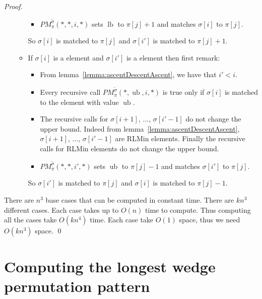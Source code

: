 \documentclass[a4paper]{llncs}
\newcommand{\RLMax}{\text{RLMax}}
\newcommand{\ptext}{\pi}
\newcommand{\ppattern}{\sigma}
\newcommand{\PM}{PM}
\DeclareMathOperator{\lb}{lb}
\DeclareMathOperator{\ub}{ub}
\begin{document}
\begin{proof}
\begin{itemize}
\begin{itemize}
\begin{itemize}
				\item $\PM^{\widetilde{\sigma}}_{\ptext}(*,*,i,*)$ sets $\lb$ to $\ptext[j]+1$ and matches $\sigma[i]$ to $\ptext[j]$.
				
			\end{itemize}
			So $\sigma[i]$ is matched to $\ptext[j]$ and
			$\sigma[i']$ is matched to $\ptext[j]+1$.


			\item If $\ppattern[i]$ is a \RLMax element and $\ppattern[i']$ is a \RLMax element then
			first remark:
			\begin{itemize}
				\item From lemma~\ref{lemma:ascentDescentAscent}, 
				we have that $i'<i$.				
				
				\item  Every recursive call $\PM^{\widetilde{\sigma}}_{\ptext}(*,\ub,i,*)$ is true only if $\sigma[i]$ is matched to the element with value $\ub$. 
				
				\item  The recursive calls for $\sigma[i+1]$, $\ldots$, $\sigma[i'-1]$ do not change the upper bound. Indeed
				from lemma~\ref{lemma:ascentDescentAscent}, $\sigma[i+1]$,  $\ldots$, $\sigma[i'-1]$ are RLMin elements. Finally the recursive calls for RLMin elements do not change the upper bound.
				
				\item $\PM^{\widetilde{\sigma}}_{\ptext}(*,*,i',*)$ sets $\ub$ to $\ptext[j]-1$ and matches $\sigma[i']$ to $\ptext[j]$.
				
			\end{itemize}
			So $\sigma[i']$ is matched to $\ptext[j]$ and
			$\sigma[i]$ is matched to $\ptext[j]-1$.


		\end{itemize}
\end{itemize}

There are $n^3$ base cases that can be computed in constant time.
There are $kn^3$ different cases. Each case takes up to $O(n)$ time to compute.
Thus computing all the cases take $O(kn^4)$ time.
Each case take $O(1)$ space, thus we need $O(kn^3)$ space.
\qed
\end{proof}


\section{Computing the longest wedge permutation pattern}
\label{section:LCS}
\end{document}
